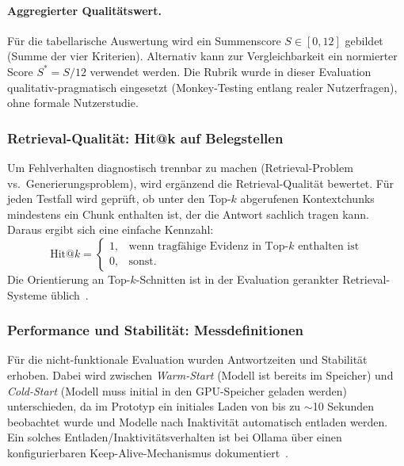 \paragraph{Aggregierter Qualitätswert.}
Für die tabellarische Auswertung wird ein Summenscore $S \in [0,12]$ gebildet (Summe der vier Kriterien).
Alternativ kann zur Vergleichbarkeit ein normierter Score $S^\ast = S/12$ verwendet werden.
Die Rubrik wurde in dieser Evaluation qualitativ-pragmatisch eingesetzt (Monkey-Testing entlang realer Nutzerfragen), ohne formale Nutzerstudie.

\subsubsection{Retrieval-Qualität: Hit@k auf Belegstellen}\label{subsec:eval-retrieval}

Um Fehlverhalten diagnostisch trennbar zu machen (Retrieval-Problem vs.\ Generierungsproblem), wird ergänzend die Retrieval-Qualität bewertet.
Für jeden Testfall wird geprüft, ob unter den Top-$k$ abgerufenen Kontextchunks mindestens ein Chunk enthalten ist, der die Antwort sachlich tragen kann.
Daraus ergibt sich eine einfache Kennzahl:
\[
    \text{Hit@}k =
    \begin{cases}
        1, & \text{wenn tragfähige Evidenz in Top-}k\text{ enthalten ist}\\
        0, & \text{sonst.}
    \end{cases}
\]
Die Orientierung an Top-$k$-Schnitten ist in der Evaluation gerankter Retrieval-Systeme üblich~\cite{manning_ir_eval_ranked}.

\subsubsection{Performance und Stabilität: Messdefinitionen}\label{subsec:eval-performance-messung}

Für die nicht-funktionale Evaluation wurden Antwortzeiten und Stabilität erhoben.
Dabei wird zwischen \emph{Warm-Start} (Modell ist bereits im Speicher) und \emph{Cold-Start} (Modell muss initial in den GPU-Speicher geladen werden) unterschieden, da im Prototyp ein initiales Laden von bis zu $\sim$10 Sekunden beobachtet wurde und Modelle nach Inaktivität automatisch entladen werden.
Ein solches Entladen/Inaktivitätsverhalten ist bei Ollama über einen konfigurierbaren Keep-Alive-Mechanismus dokumentiert~\cite{ollama_keepalive}.

